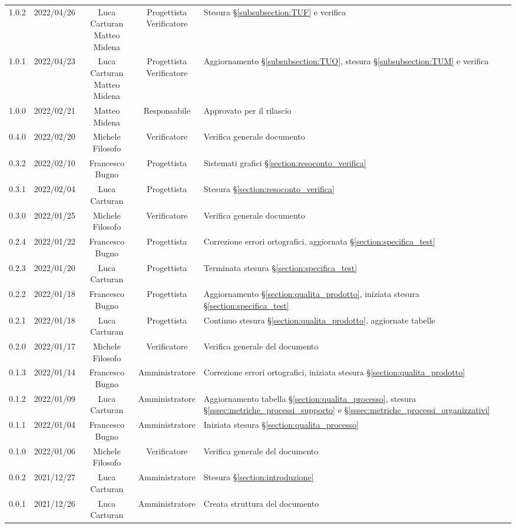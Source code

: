 \begin{center}
\begin{longtable}[c]{c | c | c | c | p{5cm}}
		1.0.2 & 2022/04/26 & \Longunderstack{Luca Carturan\\Matteo Midena} & \Longunderstack{Progettista\\Verificatore} & Stesura §\ref{subsubsection:TUF} e verifica\\
		1.0.1 & 2022/04/23 & \Longunderstack{Luca Carturan\\Matteo Midena} & \Longunderstack{Progettista\\Verificatore} & Aggiornamento §\ref{subsubsection:TUO}, stesura §\ref{subsubsection:TUM} e verifica\\
		1.0.0 & 2022/02/21 & Matteo Midena & Responsabile & Approvato per il rilascio\\
		0.4.0 & 2022/02/20 & Michele Filosofo & Verificatore & Verifica generale documento\\
		0.3.2 & 2022/02/10 & Francesco Bugno & Progettista & Sistemati grafici §\ref{section:resoconto_verifica}\\
		0.3.1 & 2022/02/04 & Luca Carturan & Progettista & Stesura §\ref{section:resoconto_verifica}\\
		0.3.0 & 2022/01/25 & Michele Filosofo & Verificatore & Verifica generale documento\\
		0.2.4 & 2022/01/22 & Francesco Bugno & Progettista & Correzione errori ortografici, aggiornata §\ref{section:specifica_test}\\
		0.2.3 & 2022/01/20 & Luca Carturan & Progettista & Terminata stesura §\ref{section:specifica_test}\\
		0.2.2 & 2022/01/18 & Francesco Bugno & Progettista & Aggiornamento §\ref{section:qualita_prodotto}, iniziata stesura §\ref{section:specifica_test}\\
		0.2.1 & 2022/01/18 & Luca Carturan & Progettista & Continuo stesura §\ref{section:qualita_prodotto}, aggiornate tabelle\\
		0.2.0 & 2022/01/17 & Michele Filosofo & Verificatore & Verifica generale del documento\\
		0.1.3 & 2022/01/14 & Francesco Bugno & Amministratore & Correzione errori ortografici, iniziata stesura §\ref{section:qualita_prodotto}\\
		0.1.2 & 2022/01/09 & Luca Carturan & Amministratore & Aggiornamento tabella §\ref{section:qualita_processo}, stesura §\ref{sssec:metriche_processi_supporto} e §\ref{sssec:metriche_processi_organizzativi}\\
		0.1.1 & 2022/01/04 & Francesco Bugno & Amministratore & Iniziata stesura §\ref{section:qualita_processo}\\
		0.1.0 & 2022/01/06 & Michele Filosofo & Verificatore & Verifica generale del documento \\
		0.0.2 & 2021/12/27 & Luca Carturan & Amministratore & Stesura §\ref{section:introduzione}\\
		0.0.1 & 2021/12/26 & Luca Carturan & Amministratore & Creata struttura del documento
	\end{longtable}
\end{center}
